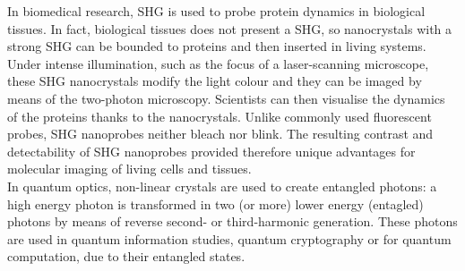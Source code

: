 In biomedical research, SHG is used to probe protein dynamics in biological tissues. In fact,  biological tissues does not present a SHG, so nanocrystals with a strong SHG can be bounded to proteins and then inserted in living systems. Under intense illumination, such as the focus of a laser-scanning microscope, these SHG nanocrystals modify the light colour and they can be imaged by means of the two-photon microscopy. Scientists can then visualise the dynamics of the proteins thanks to the nanocrystals. Unlike commonly used fluorescent probes, SHG nanoprobes neither bleach nor blink. The resulting contrast and detectability of SHG nanoprobes provided therefore unique advantages for molecular imaging of living cells and tissues. \cite{pantazis2010second}\\
%

In quantum optics, non-linear crystals are used to create entangled photons: a high energy photon is transformed in two (or more) lower energy (entagled) photons by means of reverse second- or third-harmonic generation. These photons are used in quantum information studies, quantum cryptography or for quantum computation, due to their entangled states.\cite{PhysRevLett.75.4337}\\ 

